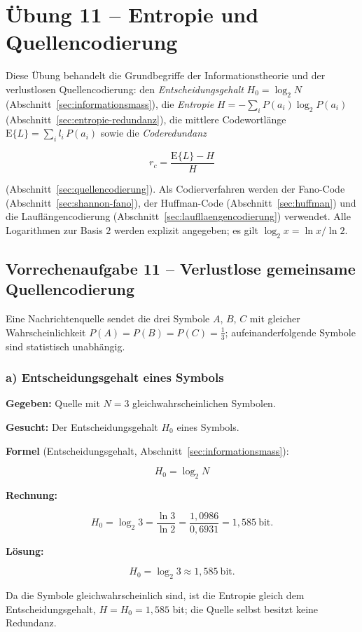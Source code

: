 \section{Übung 11 – Entropie und Quellencodierung}

Diese Übung behandelt die Grundbegriffe der Informationstheorie und der
verlustlosen Quellencodierung: den \emph{Entscheidungsgehalt}
$H_0 = \log_2 N$ (Abschnitt~\ref{sec:informationsmass}), die \emph{Entropie}
$H = -\sum_i P(a_i)\log_2 P(a_i)$ (Abschnitt~\ref{sec:entropie-redundanz}),
die mittlere Codewortlänge $\mathrm{E}\{L\} = \sum_i l_i\,P(a_i)$ sowie die
\emph{Coderedundanz}

$$
r_c = \frac{\mathrm{E}\{L\} - H}{H}
$$

(Abschnitt~\ref{sec:quellencodierung}). Als Codierverfahren werden der
Fano-Code (Abschnitt~\ref{sec:shannon-fano}), der Huffman-Code
(Abschnitt~\ref{sec:huffman}) und die Lauflängencodierung
(Abschnitt~\ref{sec:laufllaengencodierung}) verwendet. Alle Logarithmen zur
Basis $2$ werden explizit angegeben; es gilt
$\log_2 x = \ln x / \ln 2$.

\subsection*{Vorrechenaufgabe 11 – Verlustlose gemeinsame Quellencodierung}

Eine Nachrichtenquelle sendet die drei Symbole $A$, $B$, $C$ mit gleicher
Wahrscheinlichkeit $P(A) = P(B) = P(C) = \tfrac{1}{3}$; aufeinanderfolgende
Symbole sind statistisch unabhängig.

\subsubsection*{a) Entscheidungsgehalt eines Symbols}

\begin{beispiel}

\textbf{Gegeben:} Quelle mit $N = 3$ gleichwahrscheinlichen Symbolen.

\textbf{Gesucht:} Der Entscheidungsgehalt $H_0$ eines Symbols.

\textbf{Formel} (Entscheidungsgehalt, Abschnitt~\ref{sec:informationsmass}):

$$
H_0 = \log_2 N
$$

\textbf{Rechnung:}

$$
H_0 = \log_2 3 = \frac{\ln 3}{\ln 2} = \frac{1{,}0986}{0{,}6931} = 1{,}585\ \text{bit}.
$$

\textbf{Lösung:}

$$
\boxed{\;H_0 = \log_2 3 \approx 1{,}585\ \text{bit}.\;}
$$

Da die Symbole gleichwahrscheinlich sind, ist die Entropie gleich dem
Entscheidungsgehalt, $H = H_0 = 1{,}585$ bit; die Quelle selbst besitzt keine
Redundanz.

\end{beispiel}

